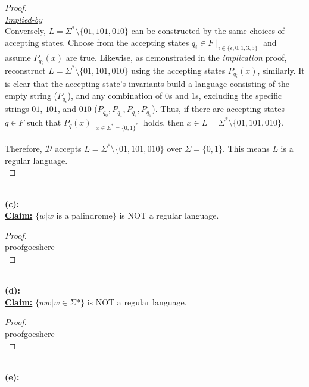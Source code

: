\documentclass[12pt]{article}
\begin{document}
\begin{proof}
    \\
    \underline{\textit{Implied-by}} \\
    Conversely, $L = \Sigma^* \setminus \{01, 101, 010\}$ can be constructed by the same choices of accepting states. Choose from the accepting states $q_i \in F \mid_{i \in \{\epsilon, 0, 1, 3, 5\}}$ and assume $P_{q_i}(x)$ are true. Likewise, as demonstrated in the \textit{implication} proof, reconstruct $L = \Sigma^* \setminus \{01, 101, 010\}$ using the accepting states $P_{q_i}(x)$, similarly. It is clear that the accepting state's invariants build a language consisting of the empty string ($P_{q_{\epsilon}}$), and any combination of $0$s and $1$s, excluding the specific strings $01$, $101$, and $010$ ($P_{q_0}, P_{q_1}, P_{q_3}, P_{q_5}$). Thus, if there are accepting states $q \in F$ such that $P_q(x) \mid_{x \in \Sigma^* = \{0, 1\}^*}$ holds, then $x \in L = \Sigma^* \setminus \{01, 101, 010\}$. \\
    \\
    Therefore, $\mathcal{D}$ accepts $L = \Sigma^* \setminus \{01, 101, 010\}$ over $\Sigma = \{0, 1\}$. This means $L$ is a regular language. \\
\end{proof}
\leavevmode\\
\textbf{(c):} \\
\textbf{\underline{Claim:}} $\{ w | w \text{ is a palindrome} \}$ is NOT a regular language.
\begin{proof}
\leavevmode\\
    proofgoeshere \\
\end{proof}
\leavevmode\\
\textbf{(d):} \\
\textbf{\underline{Claim:}} $\{ ww | w \in \Sigma* \}$ is NOT a regular language.
\begin{proof}
\leavevmode\\
    proofgoeshere \\
\end{proof}
\leavevmode\\
\textbf{(e):} \\
\end{document}
